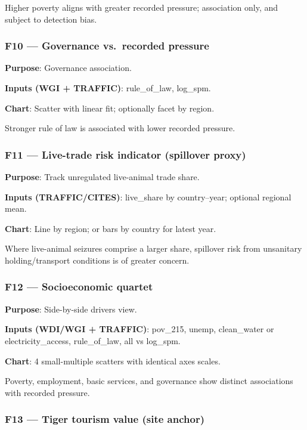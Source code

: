\documentclass[
]{article}
\begin{document}
Higher poverty aligns with greater recorded pressure; association only,
and subject to detection bias.

\subsubsection{F10 --- Governance vs.~recorded
pressure}\label{f10-governance-vs.-recorded-pressure}

\textbf{Purpose}: Governance association.

\textbf{Inputs (WGI + TRAFFIC)}: rule\_of\_law, log\_spm.

\textbf{Chart}: Scatter with linear fit; optionally facet by region.

Stronger rule of law is associated with lower recorded pressure.

\subsubsection{F11 --- Live-trade risk indicator (spillover
proxy)}\label{f11-live-trade-risk-indicator-spillover-proxy}

\textbf{Purpose}: Track unregulated live-animal trade share.

\textbf{Inputs (TRAFFIC/CITES)}: live\_share by country--year; optional
regional mean.

\textbf{Chart}: Line by region; or bars by country for latest year.

Where live-animal seizures comprise a larger share, spillover risk from
unsanitary holding/transport conditions is of greater concern.

\subsubsection{F12 --- Socioeconomic
quartet}\label{f12-socioeconomic-quartet}

\textbf{Purpose}: Side-by-side drivers view.

\textbf{Inputs (WDI/WGI + TRAFFIC)}: pov\_215, unemp, clean\_water or
electricity\_access, rule\_of\_law, all vs log\_spm.

\textbf{Chart}: 4 small-multiple scatters with identical axes scales.

Poverty, employment, basic services, and governance show distinct
associations with recorded pressure.

\subsubsection{F13 --- Tiger tourism value (site
anchor)}\label{f13-tiger-tourism-value-site-anchor}
\end{document}
